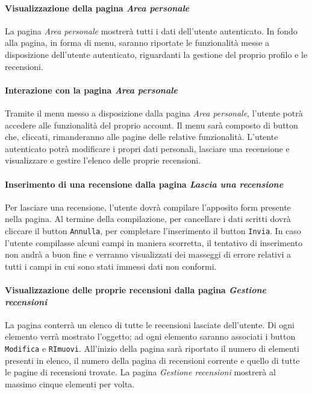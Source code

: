 \paragraph{Visualizzazione della pagina \textit{Area personale}}
\label{analisi-casi-uso-attori-principali-utente-autenticato-2}
La pagina \textit{Area personale} mostrerà tutti i dati dell'utente autenticato. In fondo alla pagina, in forma di menu, saranno riportate le funzionalità messe a disposizione dell'utente autenticato, riguardanti la gestione del proprio profilo e le recensioni.


\paragraph{Interazione con la pagina \textit{Area personale}}
\label{analisi-casi-uso-attori-principali-utente-autenticato-3}
Tramite il menu messo a disposizione dalla pagina \textit{Area personale}, l'utente potrà accedere alle funzionalità del proprio account. Il menu sarà composto di button che, cliccati, rimanderanno alle pagine delle relative funzionalità. L'utente autenticato potrà modificare i propri dati personali, lasciare una recensione e visualizzare e gestire l'elenco delle proprie recensioni.


\paragraph{Inserimento di una recensione dalla pagina \textit{Lascia una recensione}}
\label{analisi-casi-uso-attori-principali-utente-autenticato-4}
Per lasciare una recensione, l'utente dovrà compilare l'apposito form presente nella pagina. Al termine della compilazione, per cancellare i dati scritti dovrà cliccare il button \texttt{Annulla}, per completare l'inserimento il button \texttt{Invia}. In caso l'utente compilasse alcuni campi in maniera scorretta, il tentativo di inserimento non andrà a buon fine e verranno visualizzati dei masseggi di errore relativi a tutti i campi in cui sono stati immessi dati non conformi.


\paragraph{Visualizzazione delle proprie recensioni dalla pagina \textit{Gestione recensioni}}
\label{analisi-casi-uso-attori-principali-utente-autenticato-5}
La pagina conterrà un elenco di tutte le recensioni lasciate dell'utente. Di ogni elemento verrà mostrato l'oggetto; ad ogni elemento saranno associati i button \texttt{Modifica} e  \texttt{RImuovi}. All'inizio della pagina sarà riportato il numero di elementi presenti in elenco, il numero della pagina di recensioni corrente e quello di tutte le pagine di recensioni trovate. La pagina \textit{Gestione recensioni} mostrerà al massimo cinque elementi per volta.


